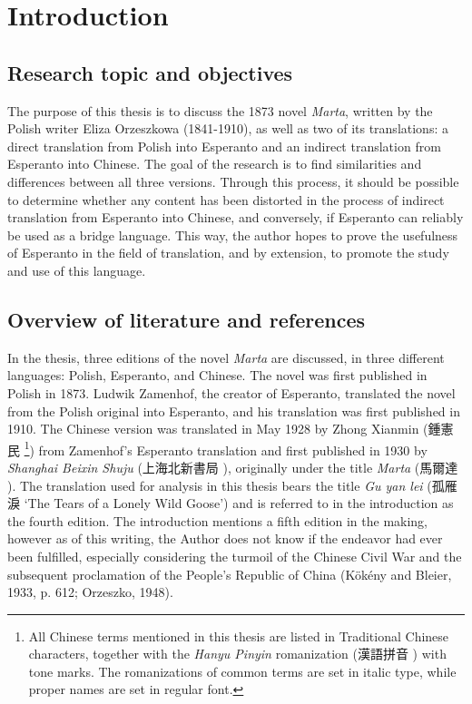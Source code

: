 \chapter{Introduction}

\section{Research topic and objectives}
The purpose of this thesis is to discuss the 1873 novel \textit{Marta}, written by the Polish writer Eliza Orzeszkowa (1841-1910), as well as two of its translations: a direct translation from Polish into Esperanto and an indirect translation from Esperanto into Chinese.
The goal of the research is to find similarities and differences between all three versions.
Through this process, it should be possible to determine whether any content has been distorted in the process of indirect translation from Esperanto into Chinese, and conversely, if Esperanto can reliably be used as a bridge language.
This way, the author hopes to prove the usefulness of Esperanto in the field of translation, and by extension, to promote the study and use of this language.

\section{Overview of literature and references}
In the thesis, three editions of the novel \textit{Marta} are discussed, in three different languages: Polish, Esperanto, and Chinese.
The novel was first published in Polish in 1873.
Ludwik Zamenhof, the creator of Esperanto, translated the novel from the Polish original into Esperanto, and his translation was first published in 1910.
The Chinese version was translated in May 1928 by Zhong Xianmin (鍾憲民 %
\footnote{All Chinese terms mentioned in this thesis are listed in Traditional Chinese characters, together with the \textit{Hanyu Pinyin} romanization (漢語拼音 ) with tone marks. The romanizations of common terms are set in italic type, while proper names are set in regular font.}) %
from Zamenhof's Esperanto translation and first published in 1930 by \textit{Shanghai Beixin Shuju} (上海北新書局 ), originally under the title \textit{Marta} (馬爾達 ).
The translation used for analysis in this thesis bears the title \textit{Gu yan lei} (孤雁淚  `The Tears of a Lonely Wild Goose') and is referred to in the introduction as the fourth edition.
The introduction mentions a fifth edition in the making, however as of this writing, the Author does not know if the endeavor had ever been fulfilled, especially considering the turmoil of the Chinese Civil War and the subsequent proclamation of the People's Republic of China
(Kökény and Bleier, 1933, p. 612; Orzeszko, 1948).

